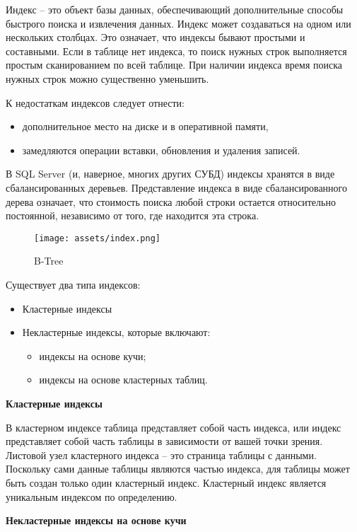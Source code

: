Индекс – это объект базы данных, обеспечивающий дополнительные способы быстрого поиска и извлечения данных. Индекс может создаваться на одном или нескольких столбцах. 
Это означает, что индексы бывают простыми и составными. Если в таблице нет индекса, то поиск нужных строк выполняется простым сканированием по всей таблице. При наличии индекса время поиска нужных строк можно существенно уменьшить. 

К недостаткам индексов следует отнести:
\begin{itemize}
	\item дополнительное место на диске и в оперативной памяти, 
	\item замедляются операции вставки, обновления и удаления записей. 
\end{itemize}

В SQL Server (и, наверное, многих других СУБД) индексы хранятся в виде сбалансированных деревьев. Представление индекса в виде сбалансированного дерева означает, что стоимость поиска любой строки остается относительно постоянной, независимо от того, где находится эта строка. 

\begin{figure}[ht!]
	\centering
 	\texttt{[image: assets/index.png]}
	\caption{B-Tree} 
\end{figure}
\FloatBarrier
Существует два типа индексов: 

\begin{itemize}
	\item Кластерные индексы
	\item Некластерные индексы, которые включают: 
	\begin{itemize}[label=--]
		\item индексы на основе кучи;
		\item индексы на основе кластерных таблиц.
	\end{itemize}
\end{itemize}

\textbf{Кластерные индексы}

В кластерном индексе таблица представляет собой часть индекса, или индекс представляет собой часть таблицы в зависимости от вашей точки зрения. Листовой узел кластерного индекса – это страница таблицы с данными. Поскольку сами данные таблицы являются частью индекса, для таблицы может быть создан только один кластерный индекс. Кластерный индекс является уникальным индексом по определению.

\textbf{Некластерные индексы на основе кучи}

